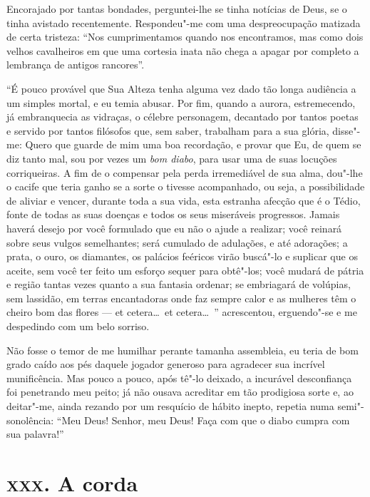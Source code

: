 Encorajado por tantas bondades, perguntei-lhe se tinha notícias de
Deus, se o tinha avistado recentemente. Respondeu"-me com uma
despreocupação matizada de certa tristeza: “Nos
cumprimentamos quando nos encontramos, mas como dois velhos
cavalheiros em que uma cortesia inata  não chega a apagar
por completo a lembrança de antigos rancores''.

“É pouco provável que Sua Alteza tenha alguma vez dado tão longa
audiência a um simples mortal, e eu temia abusar. Por fim, quando a
aurora, estremecendo, já embranquecia as vidraças, o célebre
personagem, decantado por tantos poetas e servido por tantos filósofos
que, sem saber, trabalham para a sua glória, disse"-me: Quero
que guarde de mim uma boa recordação, e provar que Eu, de
quem se diz tanto mal, sou por vezes um \textit{bom diabo}, para usar uma de
suas locuções corriqueiras. A fim de o compensar pela perda
irremediável de sua alma, dou"-lhe o cacife que teria ganho se a
sorte o tivesse acompanhado, ou seja, a possibilidade de aliviar e 
vencer, durante toda a sua vida, esta estranha afecção que é o Tédio,
fonte de todas as suas doenças e todos os seus miseráveis progressos.
Jamais haverá desejo por você formulado que eu não o ajude a realizar;
você reinará sobre seus vulgos semelhantes; será cumulado de
adulações, e até adorações; a prata, o ouro, os diamantes, os
palácios feéricos virão buscá"-lo e suplicar que os aceite, sem
você ter feito um esforço sequer para obtê"-los; você mudará de
pátria e região tantas vezes quanto a sua fantasia ordenar; se
embriagará de volúpias, sem lassidão, em terras encantadoras onde faz
sempre calor e as mulheres têm o cheiro bom das flores
--- et cetera\ldots\  et cetera\ldots\ '' acrescentou, erguendo"-se e
me despedindo com um belo sorriso.



Não fosse o temor de me humilhar perante tamanha assembleia, eu teria
de bom grado caído aos pés daquele jogador generoso para agradecer
sua incrível munificência. Mas pouco a pouco, após tê"-lo deixado, a
incurável desconfiança foi penetrando meu peito; já não ousava acreditar em
tão prodigiosa sorte e, ao deitar"-me, ainda rezando por um
resquício de hábito inepto, repetia numa semi"-sonolência:
“Meu Deus! Senhor, meu Deus! Faça com que o diabo cumpra
com sua palavra!''

\chapter{\textsc{xxx.} A corda}

